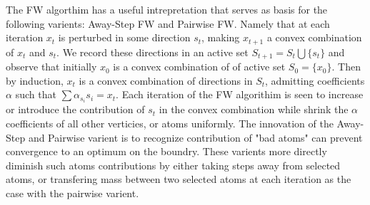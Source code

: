 \documentclass{article}
\begin{document}
The FW algorthim has a useful intrepretation that serves as basis for the following varients: Away-Step FW and Pairwise FW. Namely that at each iteration $x_t$ is perturbed in some direction $s_t$, making $x_{t+1}$ a convex combination of $x_t$ and $s_t$. We record these directions in an active set $S_{t+1} = S_t \bigcup \{s_t\}$ and observe that initially $x_0$ is a convex combination of of active set $S_0 = \{x_0\}$. Then by induction, $x_t$ is a convex combination of directions in $S_t$, admitting coefficients $\alpha$ such that $\sum \alpha_{s_i} s_i = x_t$.
Each iteration of the FW algorithim is seen to increase or introduce the contribution of $s_t$ in the convex combination while shrink the $\alpha$ coefficients of all other verticies, or atoms uniformly.
The innovation of the Away-Step and Pairwise varient is to recognize contribution of "bad atoms" can prevent convergence to an optimum on the boundry. These varients more directly diminish such atoms contributions by either taking steps away from selected atoms, or transfering mass between two selected atoms at each iteration as the case with the pairwise varient.
\end{document}
